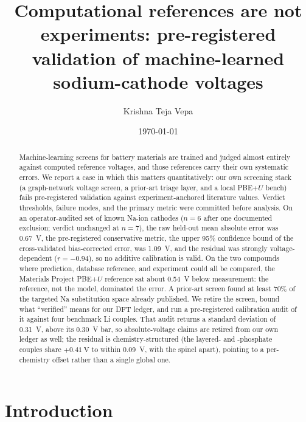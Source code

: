 \documentclass[reprint,aps,prb,amsmath,amssymb,nofootinbib,longbibliography]{revtex4-2}
\begin{document}
\title{Computational references are not experiments: pre-registered validation of machine-learned sodium-cathode voltages}

\author{Krishna Teja Vepa}

\date{\today}

\begin{abstract}
Machine-learning screens for battery materials are trained and judged almost
entirely against computed reference voltages, and those references carry their
own systematic errors. We report a case in which this matters quantitatively:
our own screening stack (a graph-network voltage screen, a prior-art triage
layer, and a local PBE+$U$ bench) fails pre-registered validation against
experiment-anchored literature values. Verdict thresholds, failure modes, and
the primary metric were committed before analysis. On an operator-audited set
of known Na-ion cathodes ($n=6$ after one documented exclusion; verdict
unchanged at $n=7$), the raw held-out mean absolute error was \SI{0.67}{\volt},
the pre-registered conservative metric, the upper 95\% confidence bound of
the cross-validated bias-corrected error, was \SI{1.09}{\volt}, and the
residual was strongly voltage-dependent ($r=-0.94$), so no additive calibration
is valid. On the two compounds where prediction, database reference, and
experiment could all be compared, the Materials Project PBE+$U$ reference sat
about \SI{0.54}{\volt} below measurement: the reference, not the model,
dominated the error. A prior-art screen found at least 70\% of the targeted Na
substitution space already published. We retire the screen, bound what
``verified'' means for our DFT ledger, and run a pre-registered calibration
audit of it against four benchmark Li couples. That audit returns a standard
deviation of \SI{0.31}{\volt}, above its \SI{0.30}{\volt} bar, so absolute-voltage
claims are retired from our own ledger as well; the residual is chemistry-structured
(the layered- and -phosphate couples share $+\SI{0.41}{\volt}$ to
within \SI{0.09}{\volt}, with the  spinel apart), pointing to a per-chemistry
offset rather than a single global one.
\end{abstract}

\maketitle

\section{Introduction}
\label{sec:intro}
\end{document}
